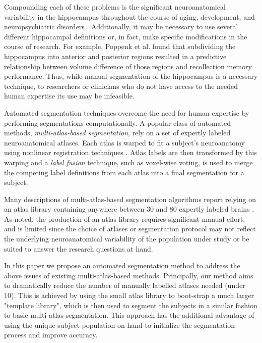 \documentclass{article}\usepackage[]{graphicx}\usepackage[]{color}
\begin{document}
Compounding each of these problems is the significant neuroanatomical
variability in the hippocampus throughout the course of aging, development, and
neuropsychiatric disorders \citep{Mouiha2011}.  Additionally, it may be
necessary to use several different hippocampal definitions or, in fact, make
specific modifications in the course of research. For example, Poppenk et al.
\citep{Poppenk2011} found that subdividing the hippocampus into anterior and
posterior regions resulted in a predictive relationship between volume
difference of those regions and recollection memory performance.  Thus, while
manual segmentation of the hippocampus is a necessary technique, to researchers
or clinicians who do not have access to the needed human expertise its use may
be infeasible.  

Automated segmentation techniques overcome the need for human expertise by
performing segmentations computationally.  A popular class of automated
methods, {\it multi-atlas-based segmentation}, rely on a set of expertly
labeled neuroanatomical atlases. Each atlas is warped to fit a subject's
neuroanatomy using nonlinear registration
techniques \citep{Collins1995,Klein2009}.  Atlas labels are then transformed by
this warping and a {\it label fusion} technique, such as voxel-wise voting, is
used to merge the competing label definitions from each atlas into a final
segmentation for a subject.  

Many descriptions of multi-atlas-based segmentation algorithms report relying
on an atlas library containing anywhere between 30 and 80 expertly labeled
brains \citep{Heckemann2011,Collins2010,Aljabar2009,Leung2010,Lotjonen2010}.  As
noted, the production of an atlas library requires significant manual effort,
and is limited since the choice of atlases or segmentation protocol may not
reflect the underlying neuroanatomical variability of the population under
study or be suited to answer the research questions at hand.

In this paper we propose an automated segmentation method to address the above
issues of existing multi-atlas-based methods. Principally, our method aims to
dramatically reduce the number of manually labelled atlases needed (under 10).
This is achieved by using the small atlas library to boot-strap a much larger
"template library", which is then used to segment the subjects in a similar
fashion to basic multi-atlas segmentation. This approach has the additional
advantage of using the unique subject population on hand to initialize the
segmentation process and improve accuracy.
\end{document}
